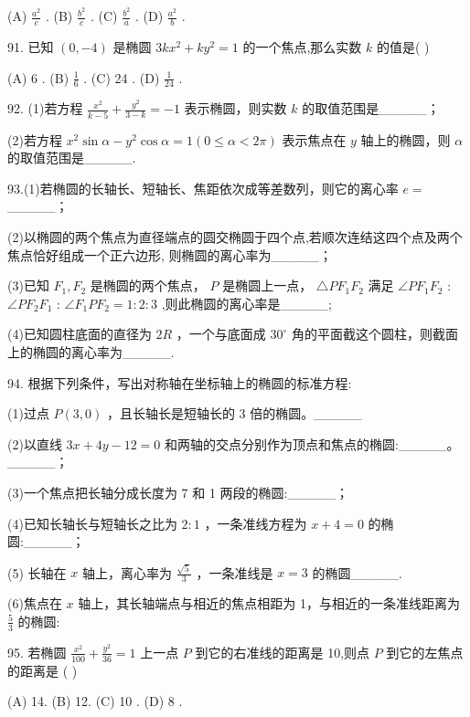 \documentclass[10pt]{article}
\begin{document}
(A) \(\frac{{a}^{2}}{c}\) . (B) \(\frac{{b}^{2}}{c}\) . (C) \(\frac{{b}^{2}}{a}\) . (D) \(\frac{{a}^{2}}{b}\) .

91. 已知 \(\left( {0, - 4}\right)\) 是椭圆 \({3k}{x}^{2} + k{y}^{2} = 1\) 的一个焦点,那么实数 \(k\) 的值是( )

(A) 6 . (B) \(\frac{1}{6}\) . (C) 24 . (D) \(\frac{1}{24}\) .

92. (1)若方程 \(\frac{{x}^{2}}{k - 5} + \frac{{y}^{2}}{3 - k} =  - 1\) 表示椭圆，则实数 \(k\) 的取值范围是\_\_\_\_\_；

(2)若方程 \({x}^{2}\sin \alpha  - {y}^{2}\cos \alpha  = 1\left( {0 \leq  \alpha  < {2\pi }}\right)\) 表示焦点在 \(y\) 轴上的椭圆，则 \(\alpha\) 的取值范围是\_\_\_\_\_.

93.(1)若椭圆的长轴长、短轴长、焦距依次成等差数列，则它的离心率 \(e =\) \_\_\_\_\_；

(2)以椭圆的两个焦点为直径端点的圆交椭圆于四个点,若顺次连结这四个点及两个焦点恰好组成一个正六边形, 则椭圆的离心率为\_\_\_\_\_；

(3)已知 \({F}_{1},{F}_{2}\) 是椭圆的两个焦点， \(P\) 是椭圆上一点， \(\bigtriangleup P{F}_{1}{F}_{2}\) 满足 \(\angle P{F}_{1}{F}_{2}\) : \(\angle P{F}_{2}{F}_{1}\) : \(\angle {F}_{1}P{F}_{2} = 1 : 2 : 3\) ,则此椭圆的离心率是\_\_\_\_\_;

(4)已知圆柱底面的直径为 \({2R}\) ，一个与底面成 \({30}^{ \circ  }\) 角的平面截这个圆柱，则截面上的椭圆的离心率为\_\_\_\_\_.

94. 根据下列条件，写出对称轴在坐标轴上的椭圆的标准方程:

(1)过点 \(P\left( {3,0}\right)\) ，且长轴长是短轴长的 3 倍的椭圆。\_\_\_\_\_

(2)以直线 \({3x} + {4y} - {12} = 0\) 和两轴的交点分别作为顶点和焦点的椭圆:\_\_\_\_\_。\_\_\_\_\_；

(3)一个焦点把长轴分成长度为 7 和 1 两段的椭圆:\_\_\_\_\_；

(4)已知长轴长与短轴长之比为 \(2 : 1\) ，一条准线方程为 \(x + 4 = 0\) 的椭圆:\_\_\_\_\_；

(5) 长轴在 \(x\) 轴上，离心率为 \(\frac{\sqrt{5}}{3}\) ，一条准线是 \(x = 3\) 的椭圆\_\_\_\_\_.

(6)焦点在 \(x\) 轴上，其长轴端点与相近的焦点相距为 1，与相近的一条准线距离为 \(\frac{5}{3}\) 的椭圆:

95. 若椭圆 \(\frac{{x}^{2}}{100} + \frac{{y}^{2}}{36} = 1\) 上一点 \(P\) 到它的右准线的距离是 10,则点 \(P\) 到它的左焦点的距离是 ( )

(A) 14. (B) 12. (C) 10 . (D) 8 .
\end{document}
